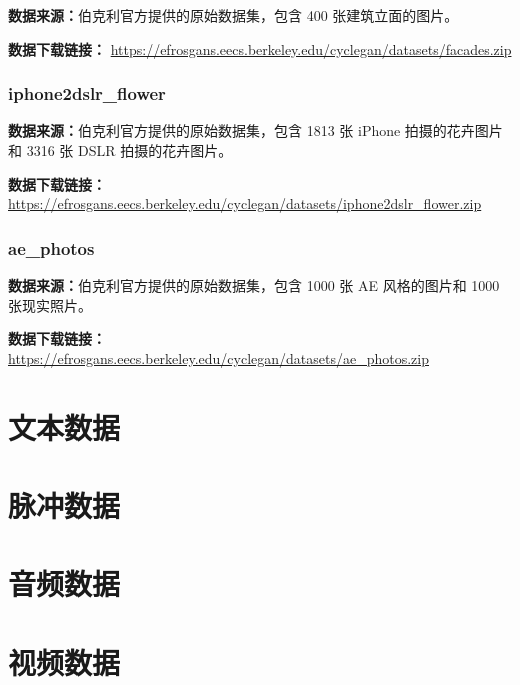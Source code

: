 \textbf{数据来源：}伯克利官方提供的原始数据集，包含 400 张建筑立面的图片。

\textbf{数据下载链接：}
\url{https://efrosgans.eecs.berkeley.edu/cyclegan/datasets/facades.zip}

\subsubsection{iphone2dslr\_flower}

\textbf{数据来源：}伯克利官方提供的原始数据集，包含 1813 张 iPhone 
拍摄的花卉图片和 3316 张 DSLR 拍摄的花卉图片。

\textbf{数据下载链接：}
\url{https://efrosgans.eecs.berkeley.edu/cyclegan/datasets/iphone2dslr_flower.zip}

\subsubsection{ae\_photos}

\textbf{数据来源：}伯克利官方提供的原始数据集，包含 1000 张 AE 风格的图片和 1000 张现实照片。

\textbf{数据下载链接：}
\url{https://efrosgans.eecs.berkeley.edu/cyclegan/datasets/ae_photos.zip}


\section{文本数据}





\section{脉冲数据}



\section{音频数据}


\section{视频数据}

